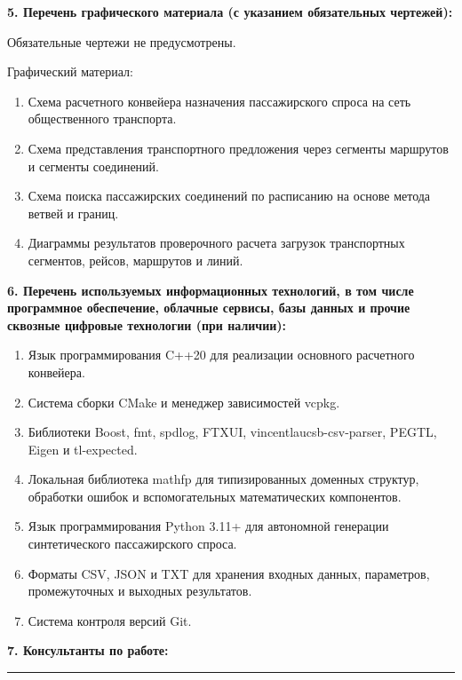 \documentclass[14pt,a4paper]{extarticle}
\newcommand{\blankline}{\rule{\linewidth}{0.4pt}}
\begin{document}
\vspace{0.7em}

\textbf{5. Перечень графического материала (с указанием обязательных чертежей):}

Обязательные чертежи не предусмотрены.

Графический материал:
\begin{enumerate}
  \item Схема расчетного конвейера назначения пассажирского спроса на сеть общественного транспорта.
  \item Схема представления транспортного предложения через сегменты маршрутов и сегменты соединений.
  \item Схема поиска пассажирских соединений по расписанию на основе метода ветвей и границ.
  \item Диаграммы результатов проверочного расчета загрузок транспортных сегментов, рейсов, маршрутов и линий.
\end{enumerate}

\vspace{0.7em}

\textbf{6. Перечень используемых информационных технологий, в том числе программное обеспечение, облачные сервисы, базы данных и прочие сквозные цифровые технологии (при наличии):}
\begin{enumerate}
  \item Язык программирования C++20 для реализации основного расчетного конвейера.
  \item Система сборки CMake и менеджер зависимостей vcpkg.
  \item Библиотеки Boost, fmt, spdlog, FTXUI, vincentlaucsb-csv-parser, PEGTL, Eigen и tl-expected.
  \item Локальная библиотека mathfp для типизированных доменных структур, обработки ошибок и вспомогательных математических компонентов.
  \item Язык программирования Python 3.11+ для автономной генерации синтетического пассажирского спроса.
  \item Форматы CSV, JSON и TXT для хранения входных данных, параметров, промежуточных и выходных результатов.
  \item Система контроля версий Git.
\end{enumerate}

\vspace{0.7em}

\textbf{7. Консультанты по работе:} \blankline

\vspace{1.2em}
\end{document}
